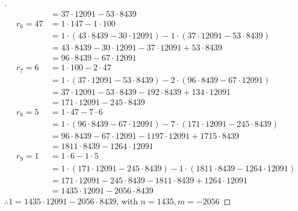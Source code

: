 \documentclass[paper=usletter, fontsize=12pt]{article}
\begin{document}
\begin{itemize}
\begin{itemize}
\begin{itemize}
\begin{proof}[\unskip\nopunct]
\begin{align*}
                        & = 37 \cdot 12091 - 53 \cdot 8439 \\
                        r_6 = 47 & = 1 \cdot 147 - 1 \cdot 100 \\
                        & = 1 \cdot (43 \cdot 8439 - 30 \cdot 12091) - 1 \cdot (37 \cdot 12091 - 53 \cdot 8439) \\
                        & = 43 \cdot 8439 - 30 \cdot 12091 - 37 \cdot 12091 + 53 \cdot 8439 \\
                        & = 96 \cdot 8439 - 67 \cdot 12091 \\
                        r_7 = 6 & = 1 \cdot 100 - 2 \cdot 47 \\
                        & = 1 \cdot (37 \cdot 12091 - 53 \cdot 8439) - 2 \cdot (96 \cdot 8439 - 67 \cdot 12091) \\
                        & = 37 \cdot 12091 - 53 \cdot 8439 - 192 \cdot 8439 + 134 \cdot 12091 \\
                        & = 171 \cdot 12091 - 245 \cdot 8439 \\
                        r_8 = 5 & = 1 \cdot 47 - 7 \cdot 6 \\
                        & = 1 \cdot (96 \cdot 8439 - 67 \cdot 12091) - 7 \cdot (171 \cdot 12091 - 245 \cdot 8439) \\
                        & = 96 \cdot 8439 - 67 \cdot 12091 - 1197 \cdot 12091 + 1715 \cdot 8439 \\
                        & = 1811 \cdot 8439 - 1264 \cdot 12091 \\
                        r_9 = 1 & = 1 \cdot 6 - 1 \cdot 5 \\
                        & = 1 \cdot (171 \cdot 12091 - 245 \cdot 8439) - 1 \cdot (1811 \cdot 8439 - 1264 \cdot 12091) \\
                        & = 171 \cdot 12091 - 245 \cdot 8439 - 1811 \cdot 8439 + 1264 \cdot 12091 \\
                        & = 1435 \cdot 12091 - 2056 \cdot 8439
                    \end{align*}
                    $\therefore 1 = 1435 \cdot 12091 - 2056 \cdot 8439$, with
                    $n = 1435, m = -2056$
                \end{proof}
                \vspace{0.2in}

            \end{itemize}


\end{itemize}
\end{itemize}
\end{document}
